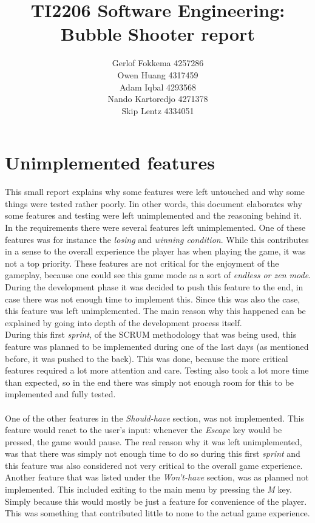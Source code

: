 \documentclass[a4paper,11pt]{article}
\title{TI2206 Software Engineering: Bubble Shooter report}
\author{Gerlof Fokkema 4257286 \\
	Owen Huang 4317459 \\
	Adam Iqbal 4293568 \\
	Nando Kartoredjo 4271378 \\
	Skip Lentz 4334051 \\
}
\begin{document}
\maketitle

\newpage
\section*{Unimplemented features}
This small report explains why some features were left untouched and why some things were tested rather poorly. Iin other words, this document elaborates why some features and testing were left unimplemented and the reasoning behind it. \\
\noindent
In the requirements there were several features left unimplemented. One of these features was for instance the \textit{losing} and \textit{winning condition}.
While this contributes in a sense to the overall experience the player has when playing the game, it was not a top priority. These features are not critical for the enjoyment of the gameplay, because one could see this game mode as a sort of \textit{endless or zen mode}. During the development phase it was decided to push this feature to the end, in case there was not enough time to implement this. Since this was also the case, this feature was left unimplemented. The main reason why this happened can be explained by going into depth of the development process itself. \\
\indent During this first \textit{sprint}, of the SCRUM methodology that was being used, this feature was planned to be implemented during one of the last days (as mentioned before, it was pushed to the back). This was done, because the more critical features required a lot more attention and care. Testing also took a lot more time than expected, so in the end there was simply not enough room for this to be implemented and fully tested. \\\\
\noindent
One of the other features in the \textit{Should-have} section, was not implemented. This feature would react to the user's input: whenever the \textit{Escape} key would be pressed, the game would pause. The real reason why it was left unimplemented, was that there was simply not enough time to do so during this first \textit{sprint} and this feature was also considered not very critical to the overall game experience.
Another feature that was listed under the \textit{Won't-have} section, was as planned not implemented. This included exiting to the main menu by pressing the \textit{M} key.  Simply because this would mostly be just a feature for convenience of the player. This was something that contributed little to none to the actual game experience.
\end{document}
